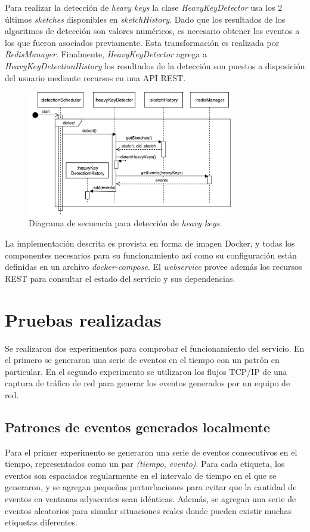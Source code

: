 \documentclass[a4paper,10pt, oneside]{article}
\begin{document}
Para realizar la detección de \textit{heavy keys} la clase \textit{HeavyKeyDetector} usa los 2 últimos \textit{sketches} disponibles en \textit{sketchHistory}. Dado que los resultados de los algoritmos de detección son valores numéricos, es necesario obtener los eventos a los que fueron asociados previamente. Esta transformación es realizada por \textit{RedisManager}. Finalmente, \textit{HeavyKeyDetector} agrega a \textit{HeavyKeyDetectionHistory} los resultados de la detección son puestos a disposición del usuario mediante recursos en una API REST.

\begin{figure}[htbp]
	\centering
	\includegraphics[width=0.8\textwidth]{graph/SecDiag-detectionSchedulerDetect.pdf}
	\caption{Diagrama de secuencia para detección de \textit{heavy keys}.}
	\label{fig:SecDiagDetectionSchedulerDetect}
\end{figure}

La implementación descrita es provista en forma de imagen Docker, y todas los componentes necesarios para su funcionamiento así como su configuración están definidas en un archivo \textit{docker-compose}. El \textit{webservice} provee además los recursos REST para consultar el estado del servicio y sus dependencias.

\section{Pruebas realizadas}

Se realizaron dos experimentos para comprobar el funcionamiento del servicio. En el primero se generaron una serie de eventos en el tiempo con un patrón en particular. En el segundo experimento se utilizaron los flujos TCP/IP de una captura de tráfico de red para generar los eventos generados por un equipo de red. 

\subsection{Patrones de eventos generados localmente}
Para el primer experimento se generaron una serie de eventos consecutivos en el tiempo, representados como un par \textit{(tiempo, evento)}. Para cada etiqueta, los eventos son espaciados regularmente en el intervalo de tiempo en el que se generaron, y se agregan pequeñas perturbaciones para evitar que la cantidad de eventos en ventanas adyacentes sean idénticas. Además, se agregan una serie de eventos aleatorios para simular situaciones reales donde pueden existir muchas etiquetas diferentes.
\end{document}

